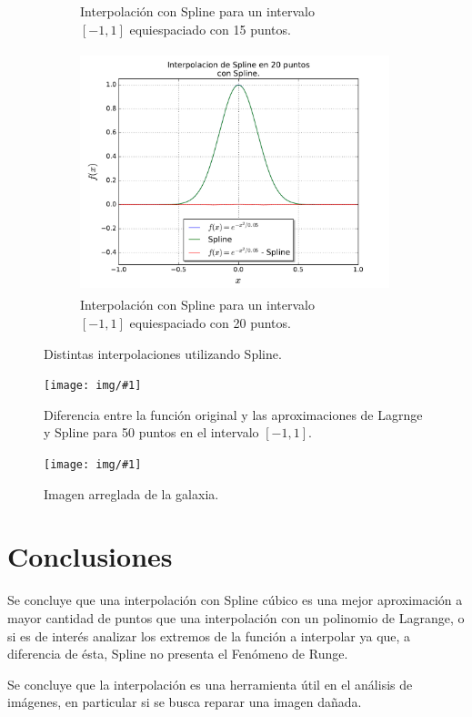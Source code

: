 \documentclass[a4paper, 11pt, spanish]{article}
\newcommand{\fig}[4]{%
	\begin{figure}[!htbp]
		\centering
		\texttt{[image: img/\#1]}
		\caption{#4}
	\end{figure}
}
\begin{document}
\begin{figure}[!hbpt]
\begin{subfigure}{.5\textwidth}
  \caption{Interpolaci\'on con Spline para un intervalo\\ $[-1,1]$ equiespaciado con 15 puntos.}
\end{subfigure}%
\begin{subfigure}{.5\textwidth}
  \centering
  \includegraphics[width=9cm, height=7cm]{img/spline20.pdf}
  \caption{Interpolaci\'on con Spline para un intervalo\\ $[-1,1]$ equiespaciado con 20 puntos.}
\end{subfigure}
\caption{Distintas interpolaciones utilizando Spline.}
\end{figure}

\fig{lagrange_spl_diff.pdf}{18cm}{13cm}{Diferencia entre la funci\'on original y las aproximaciones de Lagrnge y Spline para 50 puntos en el intervalo $[-1, 1]$.}
\fig{fixed_galaxy.pdf}{18cm}{13cm}{Imagen arreglada de la galaxia.}

\section{Conclusiones}
Se concluye que una interpolaci\'on con Spline c\'ubico es una mejor aproximaci\'on a mayor cantidad de puntos que una interpolaci\'on con un polinomio de Lagrange, o si es de inter\'es analizar los extremos de la funci\'on a interpolar ya que, a diferencia de \'esta, Spline no presenta el Fen\'omeno de Runge.

Se concluye que la interpolaci\'on es una herramienta \'util en el an\'alisis de im\'agenes, en particular si se busca reparar una imagen da\~nada.
\end{document}
